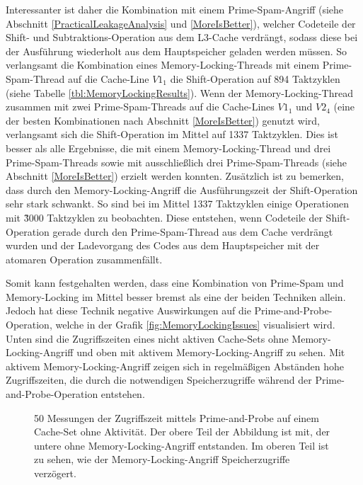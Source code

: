 Interessanter ist daher die Kombination mit einem Prime-Spam-Angriff (siehe Abschnitt \ref{PracticalLeakageAnalysis} und \ref{MoreIsBetter}), welcher Codeteile der Shift- und Subtraktions-Operation aus dem L3-Cache verdrängt, sodass diese bei der Ausführung wiederholt aus dem Hauptspeicher geladen werden müssen.
So verlangsamt die Kombination eines Memory-Locking-Threads mit einem Prime-Spam-Thread auf die Cache-Line $V1_1$ die Shift-Operation auf 894 Taktzyklen (siehe Tabelle \ref{tbl:MemoryLockingResults}).
Wenn der Memory-Locking-Thread zusammen mit zwei Prime-Spam-Threads auf die Cache-Lines $V1_1$ und $V2_4$ (eine der besten Kombinationen nach Abschnitt \ref{MoreIsBetter}) genutzt wird, verlangsamt sich die Shift-Operation im Mittel auf 1337 Taktzyklen.
Dies ist besser als alle Ergebnisse, die mit einem Memory-Locking-Thread und drei Prime-Spam-Threads sowie mit ausschließlich drei Prime-Spam-Threads (siehe Abschnitt \ref{MoreIsBetter}) erzielt werden konnten.
Zusätzlich ist zu bemerken, dass durch den Memory-Locking-Angriff die Ausführungszeit der Shift-Operation sehr stark schwankt.
So sind bei im Mittel 1337 Taktzyklen einige Operationen mit \~3000 Taktzyklen zu beobachten.
Diese entstehen, wenn Codeteile der Shift-Operation gerade durch den Prime-Spam-Thread aus dem Cache verdrängt wurden und der Ladevorgang des Codes aus dem Hauptspeicher mit der atomaren Operation zusammenfällt.

Somit kann festgehalten werden, dass eine Kombination von Prime-Spam und Memory-Locking im Mittel besser bremst als eine der beiden Techniken allein.
Jedoch hat diese Technik negative Auswirkungen auf die Prime-and-Probe-Operation, welche in der Grafik \ref{fig:MemoryLockingIssues} visualisiert wird.
Unten sind die Zugriffszeiten eines nicht aktiven Cache-Sets ohne Memory-Locking-Angriff und oben mit aktivem Memory-Locking-Angriff zu sehen.
Mit aktivem Memory-Locking-Angriff zeigen sich in regelmäßigen Abständen hohe Zugriffszeiten, die durch die notwendigen Speicherzugriffe während der Prime-and-Probe-Operation entstehen.

\label{fig:MemoryLockingIssues}
\begin{figure}[h]
\centering
\begin{scaletikzpicturetowidth}{\textwidth}

\end{scaletikzpicturetowidth}
\caption{50 Messungen der Zugriffszeit mittels Prime-and-Probe auf einem Cache-Set ohne Aktivität. Der obere Teil der Abbildung ist mit, der untere ohne Memory-Locking-Angriff entstanden. Im oberen Teil ist zu sehen, wie der Memory-Locking-Angriff Speicherzugriffe verzögert.}
\end{figure}

